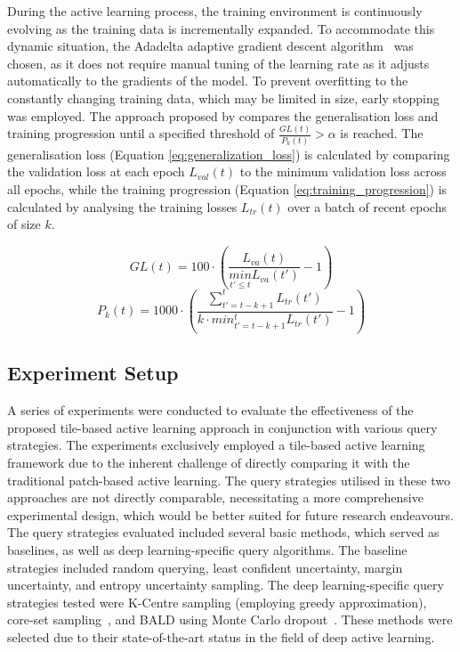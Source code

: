 During the active learning process, the training environment is continuously evolving as the training data is incrementally expanded. To accommodate this dynamic situation, the Adadelta adaptive gradient descent algorithm~\citep{zeiler2012adadelta} was chosen, as it does not require manual tuning of the learning rate as it adjusts automatically to the gradients of the model. To prevent overfitting to the constantly changing training data, which may be limited in size, early stopping was employed. The approach proposed by \cite{prechelt2012early} compares the generalisation loss and training progression until a specified threshold of $\frac{GL(t)}{P_k(t)} > \alpha$ is reached. The generalisation loss (Equation \ref{eq:generalization_loss}) is calculated by comparing the validation loss at each epoch $L_{val}(t)$ to the minimum validation loss across all epochs, while the training progression (Equation \ref{eq:training_progression}) is calculated by analysing the training losses $L_{tr}(t)$ over a batch of recent epochs of size $k$.

\begin{equation}
	GL(t) = 100 \cdot \left ( \frac{L_{va}(t)}{\underset{t'\leq t}{min}L_{va}(t')} - 1 \right )
	\label{eq:generalization_loss}
\end{equation}
\begin{equation}
	P_k(t) = 1000 \cdot \left ( \frac{\sum_{t'=t-k+1}^{t}L_{tr}(t')}{k \cdot min^{t}_{t'=t-k+1}L_{tr}(t')} - 1\right )
	\label{eq:training_progression}
\end{equation}

\subsection{Experiment Setup}
\label{subsec:active_experiments}
A series of experiments were conducted to evaluate the effectiveness of the proposed tile-based active learning approach in conjunction with various query strategies. The experiments exclusively employed a tile-based active learning framework due to the inherent challenge of directly comparing it with the traditional patch-based active learning. The query strategies utilised in these two approaches are not directly comparable, necessitating a more comprehensive experimental design, which would be better suited for future research endeavours. The query strategies evaluated included several basic methods, which served as baselines, as well as deep learning-specific query algorithms. The baseline strategies included random querying, least confident uncertainty, margin uncertainty, and entropy uncertainty sampling. The deep learning-specific query strategies tested were K-Centre sampling (employing greedy approximation), core-set sampling~\citep{sener2017active}, and BALD using Monte Carlo dropout~\citep{gal2017deep}. These methods were selected due to their state-of-the-art status in the field of deep active learning.


